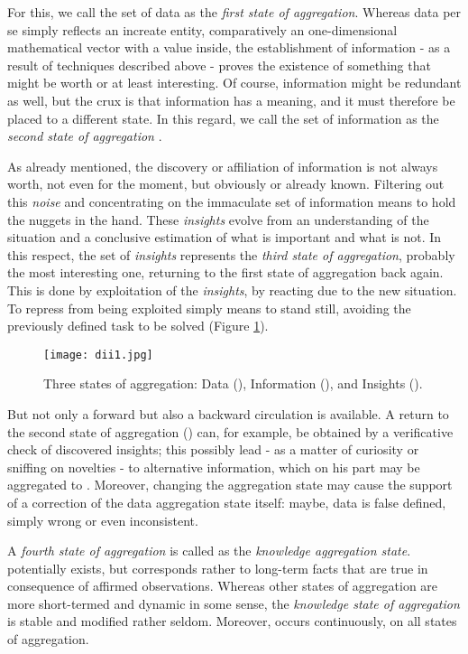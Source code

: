 \documentclass[10pt,latex8]{article}
\begin{document}
For this, we call the set of data  as the \textit{first state of aggregation}. Whereas data per se simply reflects an increate entity, comparatively an one-dimensional mathematical vector with a value inside, the establishment of information - as a result of techniques described above - proves the existence of something that might be worth or at least interesting. Of course,  information might be redundant as well, but the crux is that information has a meaning, and it must therefore be placed to a different state. In this regard, we call the set of information as the \textit{second state of aggregation} .

As already mentioned, the discovery or affiliation of information is not always worth, not even for the moment, but obviously or already known. Filtering out this \textit{noise} and concentrating on the immaculate set of information means to hold the nuggets in the hand. These \textit{insights} evolve from an understanding of the situation and a conclusive estimation of what is important and what is not. In this respect, the set of \textit{insights}  represents the \textit{third state of aggregation}, probably the most interesting one, returning to the first state of aggregation  back again. This is done by exploitation of the \textit{insights}, by reacting due to the new situation. To repress  from being exploited simply means to stand still, avoiding the previously defined task to be solved (Figure \ref{fig:dii1}).

\begin{figure}[htbp]
   \centering
   \texttt{[image: dii1.jpg]} 
   \caption{Three states of aggregation: Data (), Information (), and Insights ().}
   \label{fig:dii1}
\end{figure}

But not only a forward but also a backward circulation is available. A return to the second state of aggregation () can, for example, be obtained by a verificative check of discovered insights; this possibly lead - as a matter of curiosity or sniffing on novelties - to alternative information, which on his part may be aggregated to . Moreover, changing the aggregation state  may cause the support of a correction of the data aggregation state itself: maybe, data is false defined, simply wrong or even inconsistent.

A \textit{fourth state of aggregation}  is called as the \textit{knowledge aggregation state}.  potentially exists, but corresponds rather to long-term facts that are true in consequence of affirmed observations. Whereas other states of aggregation are more short-termed and dynamic in some sense, the \textit{knowledge state of aggregation}  is stable and modified rather seldom. Moreover,  occurs continuously, on all states of aggregation.
\end{document}
